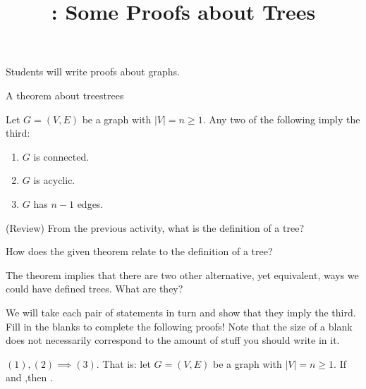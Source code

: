 \documentclass{tufte-handout}
\title{\thecourse: Some Proofs about Trees}
\date{}
\begin{document}
\maketitle

\begin{objective}
  Students will write proofs about graphs.
\end{objective}

\begin{model*}{A theorem about trees}{trees}
\begin{thm}[Trees]
  Let $G = (V,E)$ be a graph with $|V| = n \geq 1$.  Any two of the following
  imply the third:
  \begin{enumerate}
  \item $G$ is connected.
  \item $G$ is acyclic.
  \item $G$ has $n-1$ edges.
  \end{enumerate}
\end{thm}
\end{model*}

\begin{questions}
  \item (Review) From the previous activity, what is the definition of
    a tree?
  \item How does the given theorem relate to the definition of a tree?
  \item The theorem implies that there are two other alternative, yet
    equivalent, ways we could have defined trees.  What are they?
\end{questions}

We will take each pair of statements in turn and show that they imply
the third.  Fill in the blanks to complete the following proofs!  Note
that the size of a blank does not necessarily correspond to the
amount of stuff you should write in it.

\begin{lem} \label{lem:onetwothree}
  $(1), (2) \implies (3)$.  That is: let $G = (V,E)$ be a graph with $|V|
  = n \geq 1$.  If \blank\linebreak and \blank,\linebreak then \blank.
\end{lem}
\end{document}
